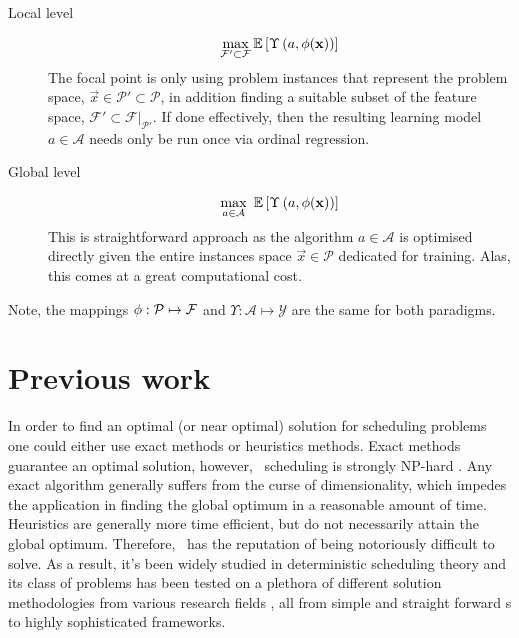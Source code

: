 \begin{description}
  \item[Local level] 
  \begin{equation}
    \max_{\mathcal{F}'\subset\mathcal{F}} 
    {\mathbb E}\left[\Upsilon\left(a,{\mathbf{\phi}}(\mathbf{x})\right)\right]
  \end{equation}
  The  focal point is only using  problem instances that represent the problem 
  space, $\vec{x}\in\mathcal{P'}\subset\mathcal{P}$, in addition finding a 
  suitable subset of the feature space, 
  $\mathcal{F}'\subset\mathcal{F}|_{\mathcal{P}'}$. If done effectively, then 
  the resulting learning model $a\in\mathcal{A}$ needs only be run once via 
  ordinal regression.
  \item[Global level]
  \begin{equation}
    \max_{a\in\mathcal{A}}~
    {\mathbb E}\left[\Upsilon\left(a,{\mathbf{\phi}}(\mathbf{x})\right)\right]
  \end{equation}
  This is  straightforward  approach as the algorithm $a\in\mathcal{A}$ is 
  optimised directly given the entire instances space $\vec{x}\in\mathcal{P}$ 
  dedicated for training. Alas, this comes at a great computational cost.
\end{description}
Note, the mappings ${\mathbf{\phi}}:\mathcal{P}\mapsto\mathcal{F}$ and 
$\Upsilon:\mathcal{A}\mapsto\mathcal{Y}$ are the same for both paradigms.

\section{Previous work}
In order to find an optimal (or near optimal) solution for scheduling problems 
one could either use exact methods or heuristics methods. Exact methods 
guarantee an optimal solution, however, \jsp\ scheduling is strongly NP-hard 
\citep{Garey76:NPhard}. Any exact algorithm generally suffers from the curse of 
dimensionality, which impedes the application in finding the global optimum in 
a reasonable amount of time. Heuristics are generally more time efficient, but 
do not necessarily attain the global optimum. Therefore, \JSP\ has the 
reputation of being notoriously difficult to solve. As a result, it's 
been widely studied in deterministic scheduling theory and its class of 
problems has been tested on a plethora of different solution methodologies from 
various research fields \citep{Meeran12}, all from simple and straight forward 
\dr s to highly sophisticated frameworks.


